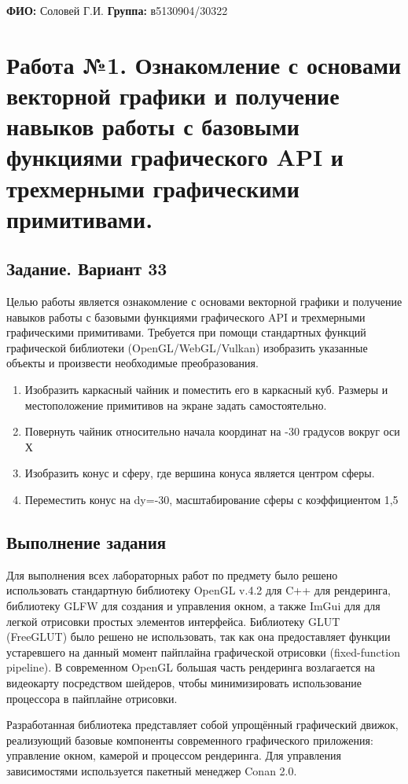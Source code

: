 \documentclass[a4paper,12pt]{article}
\begin{document}
\noindent \textbf{ФИО:} Соловей Г.И. \hfill \textbf{Группа:} в5130904/30322

\section*{Работа №1. Ознакомление с основами векторной графики и получение
  навыков работы с базовыми функциями графического API и
  трехмерными графическими примитивами.}
\subsection* {Задание. Вариант 33}
Целью работы является ознакомление с основами векторной графики и получение
навыков работы с базовыми функциями графического API и трехмерными
графическими примитивами.
Требуется при помощи стандартных функций графической библиотеки
(OpenGL/WebGL/Vulkan) изобразить указанные объекты и произвести необходимые
преобразования.
\begin{enumerate}
    \item Изобразить каркасный чайник и поместить его в каркасный куб. Размеры и
          местоположение примитивов на экране задать самостоятельно.
    \item Повернуть чайник относительно начала координат на -30 градусов вокруг оси Х
    \item Изобразить конус и сферу, где вершина конуса является центром сферы.
    \item Переместить конус на dy=-30, масштабирование сферы с коэффициентом 1,5
\end{enumerate}

\subsection* {Выполнение задания}
Для выполнения всех лабораторных работ по предмету было решено использовать стандартную библиотеку OpenGL v.4.2 для C++ для рендеринга,
библиотеку GLFW для создания и управления окном, а также ImGui для для легкой отрисовки простых элементов интерфейса.
Библиотеку GLUT (FreeGLUT) было решено не использовать, так как она предоставляет функции устаревшего на данный
момент пайплайна графической отрисовки (fixed-function pipeline). В современном OpenGL большая часть рендеринга
возлагается на видеокарту посредством шейдеров, чтобы минимизировать использование процессора в пайплайне отрисовки.

Разработанная библиотека представляет собой упрощённый графический движок,
реализующий базовые компоненты современного графического приложения: управление окном,
камерой и процессом рендеринга.
Для управления зависимостями используется пакетный менеджер Conan 2.0.
\end{document}
